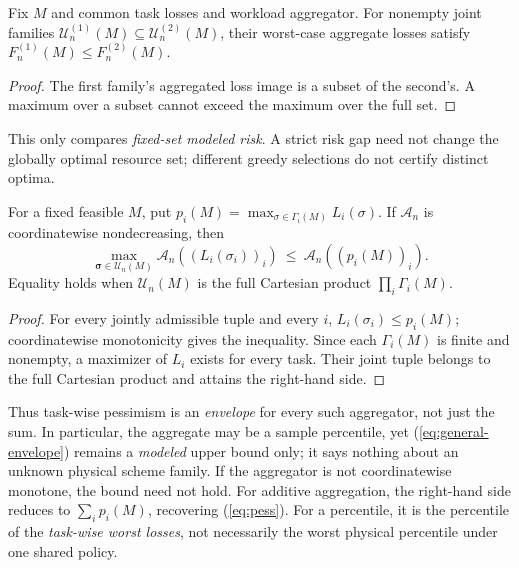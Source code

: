 \documentclass[sigconf, nonacm]{acmart}
\begin{document}
\begin{proposition}
\label{prop:general-relaxation}
Fix $M$ and common task losses and workload aggregator.
For nonempty joint families
$\mathcal U_n^{(1)}(M)\subseteq\mathcal U_n^{(2)}(M)$,
their worst-case aggregate losses satisfy
$F_n^{(1)}(M)\leq F_n^{(2)}(M)$.
\end{proposition}
\begin{proof}
The first family's aggregated loss image is a subset of the
second's. A maximum over a subset cannot exceed the maximum
over the full set.
\end{proof}
This only compares \emph{fixed-set modeled risk}. A strict
risk gap need not change the globally optimal resource set;
different greedy selections do not certify distinct optima.

\begin{proposition}
\label{prop:general-envelope}
For a fixed feasible $M$, put
$p_i(M)=\max_{\sigma\in\Gamma_i(M)}L_i(\sigma)$.
If $\mathcal A_n$ is coordinatewise nondecreasing, then
\begin{equation}
\label{eq:general-envelope}
\max_{\boldsymbol\sigma\in\mathcal U_n(M)}
 \mathcal A_n((L_i(\sigma_i))_i)
\ \leq\ \mathcal A_n((p_i(M))_i).
\end{equation}
Equality holds when $\mathcal U_n(M)$ is the full
Cartesian product $\prod_i\Gamma_i(M)$.
\end{proposition}
\begin{proof}
For every jointly admissible tuple and every $i$,
$L_i(\sigma_i)\leq p_i(M)$; coordinatewise monotonicity
gives the inequality. Since each $\Gamma_i(M)$ is
finite and nonempty, a maximizer of $L_i$ exists for
every task. Their joint tuple belongs to the full
Cartesian product and attains the right-hand side.
\end{proof}
Thus task-wise pessimism is an \emph{envelope} for
every such aggregator, not just the sum. In particular,
the aggregate may be a sample percentile, yet
(\ref{eq:general-envelope}) remains a \emph{modeled}
upper bound only; it says nothing about an unknown
physical scheme family. If the aggregator is not
coordinatewise monotone, the bound need not hold.
For additive aggregation, the right-hand side reduces
to $\sum_i p_i(M)$, recovering (\ref{eq:pess}).
For a percentile, it is the percentile of the
\emph{task-wise worst losses}, not necessarily the
worst physical percentile under one shared policy.
\end{document}
